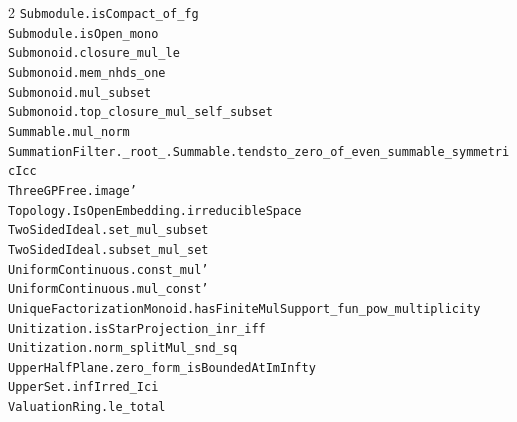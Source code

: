 \documentclass[10pt,a4paper]{article}
\begin{document}
\begin{multicols}{2}
\texttt{Submodule.\allowbreak{}isCompact\_of\_fg} \\
\texttt{Submodule.\allowbreak{}isOpen\_mono} \\
\texttt{Submonoid.\allowbreak{}closure\_mul\_le} \\
\texttt{Submonoid.\allowbreak{}mem\_nhds\_one} \\
\texttt{Submonoid.\allowbreak{}mul\_subset} \\
\texttt{Submonoid.\allowbreak{}top\_closure\_mul\_self\_subset} \\
\texttt{Summable.\allowbreak{}mul\_norm} \\
\texttt{SummationFilter.\allowbreak{}\_root\_.\allowbreak{}Summable.\allowbreak{}tendsto\_zero\_of\_even\_summable\_symmetricIcc} \\
\texttt{ThreeGPFree.\allowbreak{}image'} \\
\texttt{Topology.\allowbreak{}IsOpenEmbedding.\allowbreak{}irreducibleSpace} \\
\texttt{TwoSidedIdeal.\allowbreak{}set\_mul\_subset} \\
\texttt{TwoSidedIdeal.\allowbreak{}subset\_mul\_set} \\
\texttt{UniformContinuous.\allowbreak{}const\_mul'} \\
\texttt{UniformContinuous.\allowbreak{}mul\_const'} \\
\texttt{UniqueFactorizationMonoid.\allowbreak{}hasFiniteMulSupport\_fun\_pow\_multiplicity} \\
\texttt{Unitization.\allowbreak{}isStarProjection\_inr\_iff} \\
\texttt{Unitization.\allowbreak{}norm\_splitMul\_snd\_sq} \\
\texttt{UpperHalfPlane.\allowbreak{}zero\_form\_isBoundedAtImInfty} \\
\texttt{UpperSet.\allowbreak{}infIrred\_Ici} \\
\texttt{ValuationRing.\allowbreak{}le\_total} \\

\end{multicols}
\end{document}
